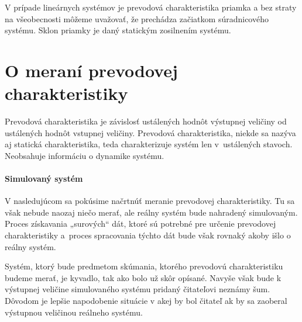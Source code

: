 \documentclass[a4paper, 10pt, ]{article}
\begin{document}
\smallskip

V prípade lineárnych systémov je prevodová charakteristika priamka a bez straty na všeobecnosti môžeme uvažovať, že prechádza začiatkom súradnicového systému. Sklon priamky je daný statickým zosilnením systému.







\section{O meraní prevodovej charakteristiky}


Prevodová charakteristika je závislosť ustálených hodnôt výstupnej veličiny od ustálených hodnôt vstupnej veličiny. Prevodová charakteristika, niekde sa nazýva aj statická charakteristika, teda charakterizuje systém len v~ustálených stavoch. Neobsahuje informáciu o dynamike systému.


\paragraph{Simulovaný systém}

V nasledujúcom sa pokúsime načrtnúť meranie prevodovej charakteristiky. Tu sa však nebude naozaj niečo merať, ale reálny systém bude nahradený simulovaným. Proces získavania „surových“ dát, ktoré sú potrebné pre určenie prevodovej charakteristiky a~proces spracovania týchto dát bude však rovnaký akoby išlo o reálny systém.


Systém, ktorý bude predmetom skúmania, ktorého prevodovú charakteristiku budeme merať, je kyvadlo, tak ako bolo už skôr opísané. Navyše však bude k výstupnej veličine simulovaného systému pridaný čitateľovi neznámy šum. Dôvodom je lepšie napodobenie situácie v akej by bol čitateľ ak by sa zaoberal výstupnou veličinou reálneho systému.
\end{document}
